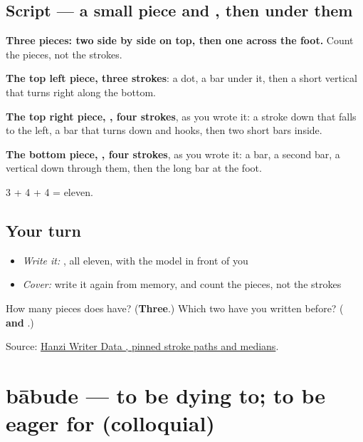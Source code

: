 \subsection*{Script — a small piece and , then  under them}

\begin{quote}
\end{quote}

\textbf{Three pieces: two side by side on top, then one across the foot.} Count the pieces, not the strokes.

\textbf{The top left piece, three strokes}: a dot, a bar under it, then a short vertical that turns right along the bottom.

\textbf{The top right piece, , four strokes}, as you wrote it: a stroke down that falls to the left, a bar that turns down and hooks, then two short bars inside.

\textbf{The bottom piece, , four strokes}, as you wrote it: a bar, a second bar, a vertical down through them, then the long bar at the foot.

3 + 4 + 4 = eleven.

\subsection*{Your turn}
\begin{itemize}
\raggedright
  \item \emph{Write it:} , all eleven, with the model in front of you
  \item \emph{Cover:} write it again from memory, and count the pieces, not the strokes
\end{itemize}

\begin{tcolorbox}[breakable,colback=teal!4,colframe=teal!35!black,title={Before you move on}]
How many pieces does  have? (\textbf{Three}.) Which two have you written before? (\textbf{ and }.)

Source: \href{https://raw.githubusercontent.com/chanind/hanzi-writer-data/68d10a4b21150cae5e1ebbd223eed289cf32d90c/data/\%E6\%9C\%9B.json}{Hanzi Writer Data , pinned stroke paths and medians}.
\end{tcolorbox}
\section[bābude]{bābude — to be dying to; to be eager for (colloquial)}

